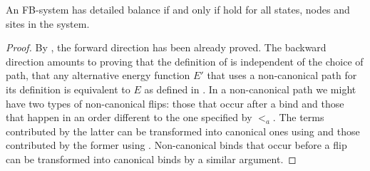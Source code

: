 \begin{proposition}
  An FB-system has detailed balance if and only if
   hold for all states,
  nodes and sites in the system.
\end{proposition}
\begin{proof}
  By ,
  the forward direction has been already proved.
  The backward direction amounts to proving that
  the definition of 
  is independent of the choice of path,
  \ie that any alternative energy function $E'$
  that uses a non-canonical path for its definition
  is equivalent to $E$ as defined in .
  In a non-canonical path
  we might have two types of non-canonical flips:
  those that occur after a bind and those that happen in
  an order different to the one specified by $<_a$.
  The terms contributed by the latter can be transformed into
  canonical ones using 
  and those contributed by the former using .
  Non-canonical binds that occur before a flip
  can be transformed into canonical binds by a similar argument.
\end{proof}




